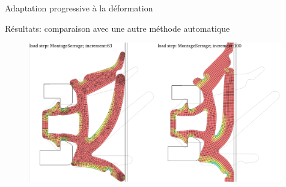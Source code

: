 \begin{frame}{Adaptation progressive à la déformation}
    \begin{figure}
        \centering
    \end{figure}
\end{frame}

\begin{frame}{Résultats: comparaison avec une autre méthode automatique}
    \begin{figure}
        \centering
        \includegraphics[width=0.99\textwidth]{img/quadsimu/comparison_with_bad_quality_mesh.PNG}
    \end{figure}
\end{frame}

